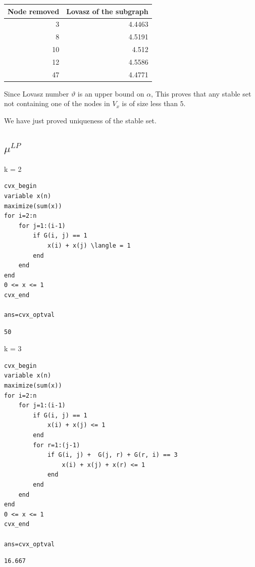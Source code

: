 \documentclass[11pt]{article}
\begin{document}
\begin{org}
\begin{center}
\begin{tabular}{rr}
Node removed & Lovasz of the subgraph\\
\hline
3 & 4.4463\\
8 & 4.5191\\
10 & 4.512\\
12 & 4.5586\\
47 & 4.4771\\
\end{tabular}
\end{center}
\end{org}



Since Lovasz number \(\vartheta\) is an upper bound on \(\alpha\), This proves that any stable set not containing one of the nodes in \(V_x\) is of size less than \(5\).

We have just proved uniqueness of the stable set.

\subsection{\(\mu^{LP}\)}
\label{sec:orgheadline3}

k = 2

\begin{verbatim}
cvx_begin 
variable x(n)
maximize(sum(x))
for i=2:n
    for j=1:(i-1)
        if G(i, j) == 1
            x(i) + x(j) \langle = 1
        end
    end
end
0 <= x <= 1
cvx_end

ans=cvx_optval
\end{verbatim}

\begin{verbatim}
50
\end{verbatim}


k = 3

\begin{verbatim}
cvx_begin 
variable x(n)
maximize(sum(x))
for i=2:n
    for j=1:(i-1)
        if G(i, j) == 1
            x(i) + x(j) <= 1
        end
        for r=1:(j-1)
            if G(i, j) +  G(j, r) + G(r, i) == 3
                x(i) + x(j) + x(r) <= 1
            end
        end
    end
end
0 <= x <= 1
cvx_end

ans=cvx_optval
\end{verbatim}

\begin{verbatim}
16.667
\end{verbatim}
\end{document}
